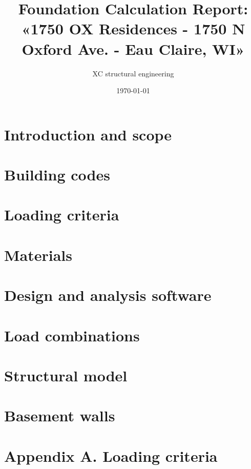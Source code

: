 

\usepackage{array, boldline, makecell, booktabs}
\newcommand\btrule[1]{\specialrule{#1}{0pt}{0pt}}
\usepackage{colortbl}
\usepackage{multicol,caption}               %
\usepackage{xcolor}
\usepackage{hyperref}
\newenvironment{Figure}
  {\par\medskip\noindent\minipage{\linewidth}}
  {\endminipage\par\medskip}
\usepackage{caption}
\usepackage[section]{placeins}

\title{Foundation Calculation Report: «1750 OX Residences - 1750 N Oxford Ave. - Eau Claire, WI» }
\author{XC structural engineering}
\date{\today}
\newcommand{\revision}{0.0}
\newcommand{\titdocum}{Foundation Calculation Report}

\maketitle
\tableofcontents
\listoftables
\listoffigures
\section{Introduction and scope}

\section{Building codes}

\section{Loading criteria}

\section{Materials}

\section{Design and analysis software}

\section{Load combinations}

\section{Structural model}

\section{Basement walls}


\clearpage
\appendix
\section{Appendix A. Loading criteria}


